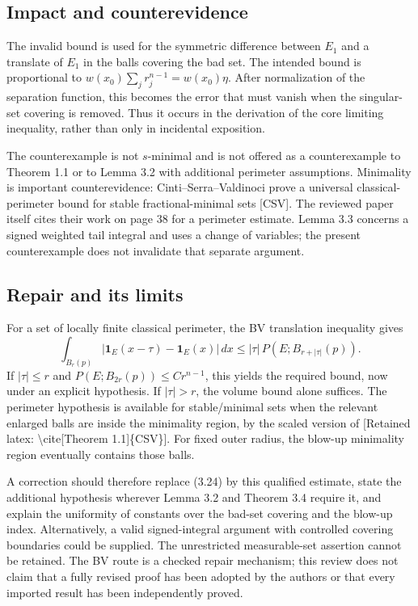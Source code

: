 \documentclass[10pt]{article}
\begin{document}
\subsection*{Impact and counterevidence}
The invalid bound is used for the symmetric difference between \(E_1\) and a translate of \(E_1\) in the balls covering the bad set. The intended bound is proportional to \(w(x_0)\sum_j r_j^{n-1}=w(x_0)\eta\). After normalization of the separation function, this becomes the error that must vanish when the singular-set covering is removed. Thus it occurs in the derivation of the core limiting inequality, rather than only in incidental exposition.\par
The counterexample is not \(s\)-minimal and is not offered as a counterexample to Theorem 1.1 or to Lemma 3.2 with additional perimeter assumptions. Minimality is important counterevidence: Cinti–Serra–Valdinoci prove a universal classical-perimeter bound for stable fractional-minimal sets [CSV]. The reviewed paper itself cites their work on page 38 for a perimeter estimate. Lemma 3.3 concerns a signed weighted tail integral and uses a change of variables; the present counterexample does not invalidate that separate argument.\par
\subsection*{Repair and its limits}
For a set of locally finite classical perimeter, the BV translation inequality gives \[\int_{B_r(p)}
 |\mathbf 1_E(x-\tau)-\mathbf 1_E(x)|\,dx
 \leq |\tau|\,P(E;B_{r+|\tau|}(p)).\] If \(|\tau|\leq r\) and \(P(E;B_{2r}(p))\leq C r^{n-1}\), this yields the required bound, now under an explicit hypothesis. If \(|\tau|>r\), the volume bound alone suffices. The perimeter hypothesis is available for stable/minimal sets when the relevant enlarged balls are inside the minimality region, by the scaled version of [Retained latex: \textbackslash{}cite[Theorem 1.1]\{CSV\}]. For fixed outer radius, the blow-up minimality region eventually contains those balls.\par
A correction should therefore replace (3.24) by this qualified estimate, state the additional hypothesis wherever Lemma 3.2 and Theorem 3.4 require it, and explain the uniformity of constants over the bad-set covering and the blow-up index. Alternatively, a valid signed-integral argument with controlled covering boundaries could be supplied. The unrestricted measurable-set assertion cannot be retained. The BV route is a checked repair mechanism; this review does not claim that a fully revised proof has been adopted by the authors or that every imported result has been independently proved.\par
\end{document}
